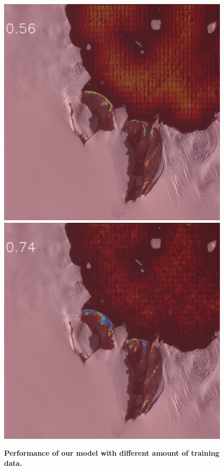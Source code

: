 \documentclass[runningheads]{llncs}
\begin{document}
\begin{figure}[h]
\includegraphics[width=\subFigx]{./fig/datagrow/MSE_single_unet_train_0_3.txt_bias-1_bs128_do0.1e25/WV03_20170217064537_10400100297FEA00_17FEB17064537-M1BS-057107305010_01_P001_u08rf3031.png}
\includegraphics[width=\subFigx]{./fig/datagrow/MSE_single_unet_train_0_4.txt_bias-1_bs128_do0.1e25/WV03_20170217064537_10400100297FEA00_17FEB17064537-M1BS-057107305010_01_P001_u08rf3031.png}



\caption{{{\bf Performance of our model with different amount of training data.}}}
\label{fig:impress}
\end{figure}
\end{document}
